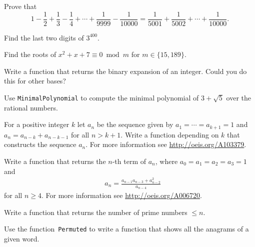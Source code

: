 \begin{prob}
	\label{prob:2sums}
	Prove that
	\[
	1-\frac12+\frac13-\frac14+\cdots+\frac{1}{9999}-\frac{1}{10000}=
	\frac{1}{5001}+\frac{1}{5002}+\cdots+\frac{1}{10000}.
	\]
\end{prob}

\begin{prob}
	\label{prob:last2}
	Find the last two digits of $3^{400}$.
\end{prob}

\begin{prob}
	\label{prob:congruence}
	Find the roots of $x^2+x+7\equiv 0\bmod m$ for $m\in\{15,189\}$.
\end{prob}

\begin{prob}
	\label{prob:binary}
	Write a function that returns the binary expansion of an integer. Could you
	do this for other bases?
\end{prob}

\begin{prob}	\label{prob:minpoly}
	Use \lstinline{MinimalPolynomial} to compute the minimal polynomial of
	$3+\sqrt{5}$ over the rational numbers.
\end{prob}

\begin{prob}\label{prob:fibok}
	For a positive integer $k$ let $a_n$ be the sequence given by $a_1=\cdots=a_{k+1}=1$ and
	$a_n=a_{n-k}+a_{n-k-1}$ for all $n>k+1$. Write a function depending on $k$
	that constructs the sequence $a_{n}$.  For more information see 
	\url{http://oeis.org/A103379}.
\end{prob}

\begin{prob}\label{prob:somos}
	Write a function that returns the $n$-th term of $a_n$, where 
	$a_0=a_1=a_2=a_3=1$ and  
	\begin{align*}
	&a_n=\frac{a_{n-1}a_{n-3}+a_{n-2}^2}{a_{n-4}}
	\end{align*}
	for all $n\geq4$. For more information see \url{http://oeis.org/A006720}.
\end{prob}

\begin{prob}\label{prob:number-primes}
	Write a function that returns the number of prime numbers $\leq n$. 
\end{prob}

\begin{prob}\label{prob:anagrams}
	Use the function~\lstinline{Permuted} to write a function that shows all
	the anagrams of a given word. 
\end{prob}

